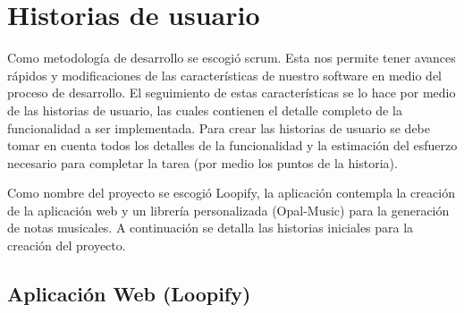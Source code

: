 \section{Historias de usuario}

Como metodología de desarrollo se escogió scrum. Esta nos permite tener avances
rápidos y modificaciones de las características de nuestro software en medio
del proceso de desarrollo. El seguimiento de estas características se lo hace
por medio de las historias de usuario, las cuales contienen el detalle
completo de la funcionalidad a ser implementada. Para crear las historias
de usuario se debe tomar en cuenta todos los detalles de la funcionalidad
y la estimación del esfuerzo necesario para completar la tarea (por medio
los puntos de la historia).

Como nombre del proyecto se escogió Loopify, la aplicación contempla
la creación de la aplicación web y un librería personalizada (Opal-Music) para
la generación de notas musicales. A continuación se detalla las historias
iniciales para la creación del proyecto.

\subsection{Aplicación Web (Loopify)}


